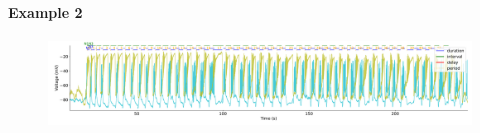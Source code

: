 \paragraph{\large{Example 2}}


\begin{figure}[htbp]
	\centering
	\begin{minipage}[b]{\textwidth}
		\centering
		\includegraphics[width=\textwidth]{./invariants/data/SUSSEX/CV1a_driven2/images/stim_cv1a2_signal_intervals_zoom.pdf}
	\end{minipage}
	\centering
	\begin{minipage}[b]{0.43\textwidth}
		\centering

\end{minipage}
\end{figure}
